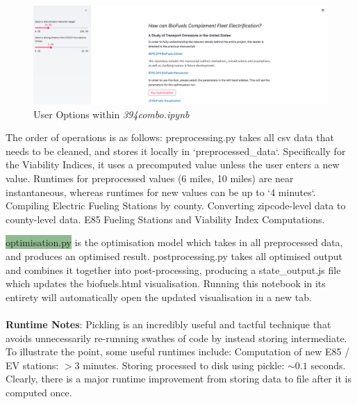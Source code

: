 \documentclass[answers]{exam}
\begin{document}
\begin{figure}[h]
    \centering
    \includegraphics[scale=0.4]{user_options.png}
    \caption{User Options within \textit{394combo.ipynb}}
    \label{fig:my_label}
\end{figure}
\begin{outline}
The order of operations is as follows:
\2\colorbox{dandelion}{preprocessing.py} takes all csv data that needs to be cleaned, and stores it locally in `preprocessed\_data`. Specifically for the Viability Indices, it uses a precomputed value unless the user enters a new value. Runtimes for preprocessed values (6 miles, 10 miles) are near instantaneous, whereas runtimes for new values can be up to `4 minutes`.
\3 Compiling Electric Fueling Stations by county.
\3 Converting zipcode-level data to county-level data.
\3 E85 Fueling Stations and Viability Index Computations.

\2 \colorbox{darkseagreen}{optimisation.py} is the optimisation model which takes in all preprocessed data, and produces an optimised result.
\2 \colorbox{babyblue}{postprocessing.py} takes all optimised output and combines it together into post-processing, producing a \colorbox{mediumlavendermagenta}{state\_output.js} file which updates the \colorbox{lilac}{biofuels.html} visualisation. Running this notebook in its entirety will automatically open the updated visualisation in a new tab.
\\ ~\\
\0 \textbf{Runtime Notes}: 
\2 Pickling is an incredibly useful and tactful technique that avoids unnecessarily re-running swathes of code by instead storing intermediate. To illustrate the point, some useful runtimes include:
\3 Computation of new E85 / EV stations: $>3$ minutes.
\3 Storing processed to disk using pickle: $\sim0.1$ seconds.
\2 Clearly, there is a major runtime improvement from storing data to file after it is computed once. 
\end{outline}
\end{document}
